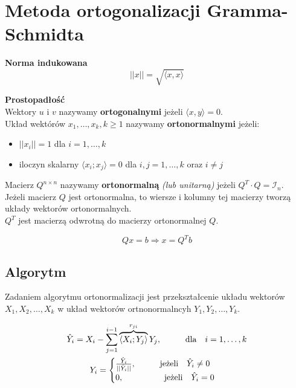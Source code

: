 \documentclass[../mn-notatki.tex]{subfiles}
\begin{document}
\section{Metoda ortogonalizacji Gramma-Schmidta}

\begin{tcolorbox}
\textbf{Norma indukowana}
\[
||x|| = \sqrt{\langle x,x \rangle}
\]
\end{tcolorbox}

\begin{tcolorbox}
\textbf{Prostopadłość}\\
Wektory $u$ i $v$ nazywamy \textbf{ortogonalnymi} jeżeli $\langle x,y \rangle = 0$.\\
Układ wektórów $x_1, \ldots, x_k, k \geqslant 1$ nazywamy \textbf{ortonormalnymi}
jeżeli:
\begin{itemize}
    \item $||x_i|| = 1$ dla $i = 1, \ldots, k$
    \item iloczyn skalarny $\langle x_i; x_j \rangle = 0$ dla $i,j = 1, \ldots, k$ oraz $i \neq j$
\end{itemize}
\end{tcolorbox}

\begin{tcolorbox}
Macierz $Q^{n\times n}$ nazywamy \textbf{ortonormalną} \textit{(lub unitarną)}
jeżeli $Q^T \cdot Q = \mathcal{I}_n$.\\

Jeżeli macierz $Q$ jest ortonormalna, to wiersze i kolumny tej macierzy
tworzą układy wektorów ortonormalnych.\\

$Q^T$ jest macierzą odwrotną do macierzy ortonormalnej $Q$.
\end{tcolorbox}

\begin{tcolorbox}
\[
Qx = b \Rightarrow x = Q^T b
\]
\end{tcolorbox}

\subsection{Algorytm}
\begin{tcolorbox}
Zadaniem algorytmu ortonormalizacji jest przekształcenie układu
wektorów $X_1 ,X_2 ,\ldots,X_k$ w układ wektorów ortnonormalncyh $Y_1 ,Y_2 ,\ldots,Y_k$.
\end{tcolorbox}

\begin{gather*}
\hat{Y}_i = X_i - \sum_{j=1}^{i-1} \overbrace{\langle X_i; Y_j \rangle}^{r_{ji}} Y_j, \hspace*{1cm} \text{dla~~ } i = 1, \ldots, k\\
Y_i =
\begin{cases}
\frac{\hat{Y}_i}{||\hat{Y}_i|| }, \hspace*{1cm} \text{jeżeli~~ } \hat{Y}_i \neq 0\\
0, \hspace*{1cm} \text{~~~~~~jeżeli~~ } \hat{Y}_i = 0
\end{cases}
\end{gather*}
\end{document}
